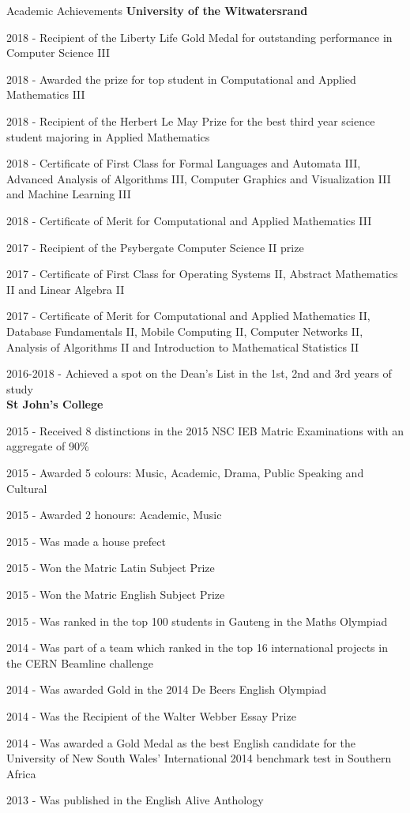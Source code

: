 \documentclass{resume} %
\begin{document}
\begin{rSection}{Academic Achievements} 
{\bf University of the Witwatersrand}
\item 2018 - Recipient of the Liberty Life Gold Medal for outstanding performance in Computer Science III
\item 2018 - Awarded the prize for top student in Computational and Applied Mathematics III
\item 2018 - Recipient of the Herbert Le May Prize for the best third year science student majoring in Applied Mathematics
\item 2018 - Certificate of First Class for Formal Languages and Automata III, Advanced Analysis of Algorithms III, Computer Graphics and Visualization III and Machine Learning III
\item 2018 - Certificate of Merit for Computational and Applied Mathematics III
\item 2017 - Recipient of the Psybergate Computer Science II prize
\item 2017 - Certificate of First Class for Operating Systems II, Abstract Mathematics II and Linear Algebra II
\item 2017 - Certificate of Merit for Computational and Applied Mathematics II, Database Fundamentals II, Mobile Computing II, Computer Networks II, Analysis of Algorithms II and Introduction to Mathematical Statistics II
\item 2016-2018 - Achieved a spot on the Dean's List in the 1st, 2nd and 3rd years of study
\\{\bf St John's College}
\item 2015 - Received 8 distinctions in the 2015 NSC IEB Matric Examinations with an aggregate of 90\%
\item 2015 - Awarded 5 colours: Music, Academic, Drama, Public Speaking and Cultural
\item 2015 - Awarded 2 honours: Academic, Music
\item 2015 - Was made a house prefect
\item 2015 - Won the Matric Latin Subject Prize
\item 2015 - Won the Matric English Subject Prize
\item 2015 - Was ranked in the top 100 students in Gauteng in the Maths Olympiad
\item 2014 - Was part of a team which ranked in the top 16 international projects in the CERN Beamline challenge
\item 2014 - Was awarded Gold in the 2014 De Beers English Olympiad 
\item 2014 - Was the Recipient of the Walter Webber Essay Prize 
\item 2014 - Was awarded a Gold Medal as the best English candidate for the University of New South Wales’ International 2014 benchmark test in Southern Africa
\item 2013 - Was published in the English Alive Anthology
\end{rSection}
\end{document}

